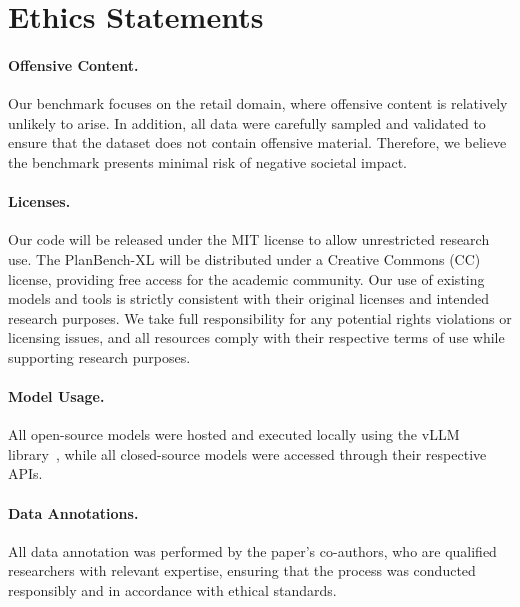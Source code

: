 \documentclass{llmxive}
\providecommand{\bench}[1]{PlanBench-XL}
\begin{document}
\section*{Ethics Statements}



\paragraph{Offensive Content.}
Our benchmark focuses on the retail domain, where offensive content is relatively unlikely to arise. 
In addition, all data were carefully sampled and validated to ensure that the dataset does not contain offensive material. 
Therefore, we believe the benchmark presents minimal risk of negative societal impact.

\paragraph{Licenses.} 
Our code will be released under the MIT license to allow unrestricted research use. 
The \bench{} will be distributed under a Creative Commons (CC) license, providing free access for the academic community. 
Our use of existing models and tools is strictly consistent with their original licenses and intended research purposes. 
We take full responsibility for any potential rights violations or licensing issues, and all resources comply with their respective terms of use while supporting research purposes.

\paragraph{Model Usage.}
All open-source models were hosted and executed locally using the vLLM library~\cite{vllm}, while all closed-source models were accessed through their respective APIs. 

\paragraph{Data Annotations.}

All data annotation was performed by the paper's co-authors, who are qualified researchers with relevant expertise, ensuring that the process was conducted responsibly and in accordance with ethical standards.
\end{document}
